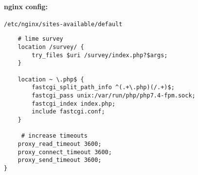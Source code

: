 \documentclass{article}
\begin{document}
\paragraph{nginx config:} 

\verb|/etc/nginx/sites-available/default|

\begin{verbatim}
    # lime survey
    location /survey/ {
        try_files $uri /survey/index.php?$args;
    }

    location ~ \.php$ {                                                                                                  
        fastcgi_split_path_info ^(.+\.php)(/.+)$;                                                                        
        fastcgi_pass unix:/var/run/php/php7.4-fpm.sock;                                                                  
        fastcgi_index index.php;                                                                                         
        include fastcgi.conf;                                                                                            
    }

     # increase timeouts
    proxy_read_timeout 3600;
    proxy_connect_timeout 3600;
    proxy_send_timeout 3600;
}        
\end{verbatim}
\end{document}
